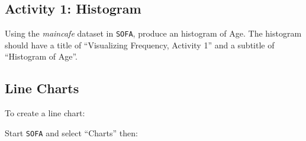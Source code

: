 \subsection{Activity 1: Histogram} \label{vfr:act01}

Using the \textit{maincafe} dataset in \texttt{SOFA}, produce an histogram of Age. The histogram should have a title of ``Visualizing Frequency, Activity 1'' and a subtitle of ``Histogram of Age''.

\subsection{Line Charts}

To create a line chart:

Start \texttt{SOFA} and select ``Charts'' then:

